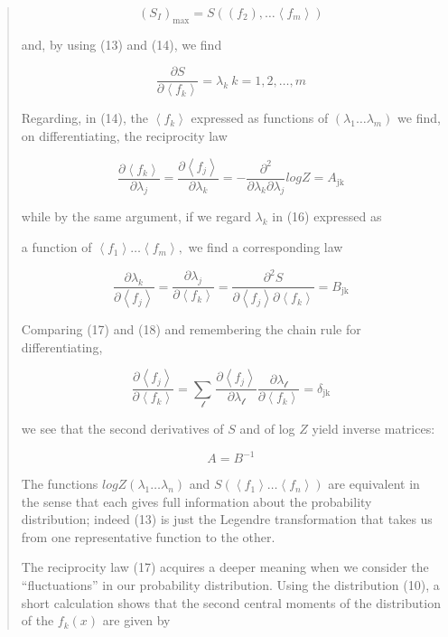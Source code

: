 \documentclass[]{article}
\begin{document}
\begin{quote}
\[\left( S_{I} \right)_{\max} = S\left( \left( f_{2} \right),\ldots\left\langle f_{m} \right\rangle \right)\]

and, by using (13) and (14), we find

\[\frac{\partial S}{\partial\left\langle f_{k} \right\rangle} = \lambda_{k}\ k = 1,2,\ldots,m\]

Regarding, in (14), the \(\left\langle f_{k} \right\rangle\) expressed
as functions of \(\left( \lambda_{1}\ldots\lambda_{m} \right)\) we find,
on differentiating, the reciprocity law

\[\frac{\partial\left\langle f_{k} \right\rangle}{\partial\lambda_{j}} = \frac{\partial\left\langle f_{j} \right\rangle}{\partial\lambda_{k}} = - \frac{\partial^{2}}{\partial\lambda_{k}\partial\lambda_{j}}logZ = A_{\text{jk}}\]

while by the same argument, if we regard \(\lambda_{k}\) in (16)
expressed as

a function of
\(\left\langle f_{1} \right\rangle\ldots\left\langle f_{m} \right\rangle,\)
we find a corresponding law

\[\frac{\partial\lambda_{k}}{\partial\left\langle f_{j} \right\rangle} = \frac{\partial\lambda_{j}}{\partial\left\langle f_{k} \right\rangle} = \frac{\partial^{2}S}{\partial\left\langle f_{j} \right\rangle\partial\left\langle f_{k} \right\rangle} = B_{\text{jk}}\]

Comparing (17) and (18) and remembering the chain rule for
differentiating,

\[\frac{\partial\left\langle f_{j} \right\rangle}{\partial\left\langle f_{k} \right\rangle} = \sum_{\mathcal{l}}^{}\mspace{2mu}\frac{\partial\left\langle f_{j} \right\rangle}{\partial\lambda_{\mathcal{l}}}\frac{\partial\lambda_{\mathcal{l}}}{\partial\left\langle f_{k} \right\rangle} = \delta_{\text{jk}}\]

we see that the second derivatives of \(S\) and of log \(Z\) yield
inverse matrices:

\[A = B^{- 1}\]

The functions \(logZ\left( \lambda_{1}\ldots\lambda_{n} \right)\) and
\(S\left( \left\langle f_{1} \right\rangle\ldots\left\langle f_{n} \right\rangle \right)\)
are equivalent in the sense that each gives full information about the
probability distribution; indeed (13) is just the Legendre
transformation that takes us from one representative function to the
other.

The reciprocity law (17) acquires a deeper meaning when we consider the
``fluctuations'' in our probability distribution. Using the distribution
(10), a short calculation shows that the second central moments of the
distribution of the \(f_{k}(x)\) are given by


\end{quote}
\end{document}
